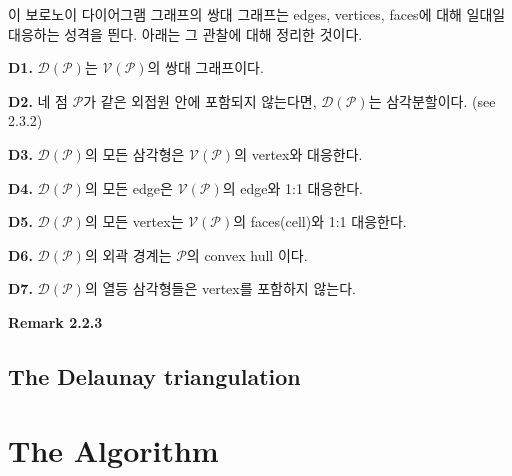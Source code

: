 \documentclass{article}
\begin{document}
이 보로노이 다이어그램 그래프의 쌍대 그래프는 edges, vertices, faces에 대해 
일대일 대응하는 성격을 띈다. 아래는 그 관찰에 대해 정리한 것이다. 

\textbf{D1.} $\mathcal{D}(\mathcal{P})$는 $\mathcal{V}(\mathcal{P})$의 
쌍대 그래프이다. 

\textbf{D2.} 네 점 $\mathcal{P}$가 같은 외접원 안에 포함되지 않는다면, 
$\mathcal{D}(\mathcal{P})$는 삼각분할이다. (see 2.3.2)

\textbf{D3.}  $\mathcal{D}(\mathcal{P})$의 모든 삼각형은 
$\mathcal{V}(\mathcal{P})$의 vertex와 대응한다. 

\textbf{D4.}  $\mathcal{D}(\mathcal{P})$의 모든 edge은 
$\mathcal{V}(\mathcal{P})$의 edge와 1:1 대응한다. 

\textbf{D5.}  $\mathcal{D}(\mathcal{P})$의 모든 vertex는 
$\mathcal{V}(\mathcal{P})$의 faces(cell)와 1:1 대응한다. 

\textbf{D6.}  $\mathcal{D}(\mathcal{P})$의 외곽 경계는 
$\mathcal{P}$의 convex hull 이다. 

\textbf{D7.}  $\mathcal{D}(\mathcal{P})$의 열등 삼각형들은 
vertex를 포함하지 않는다. 

\textbf{Remark 2.2.3} 

\subsection{The Delaunay triangulation}
    
\section{The Algorithm}
\end{document}
